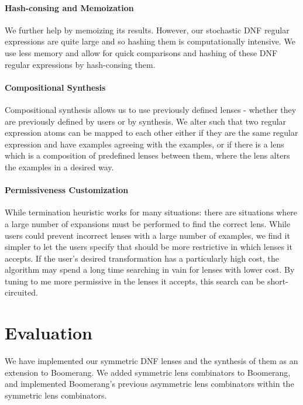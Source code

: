 \documentclass[acmsmall,screen,anonymous]{acmart}
\begin{document}
\paragraph*{Hash-consing and Memoization} We further help \GreedySynth by
memoizing its results.  However, our stochastic DNF regular expressions are
quite large and so hashing them is computationally intensive.  We use less
memory and allow for quick comparisons and hashing of these DNF regular
expressions by hash-consing them.

\paragraph*{Compositional Synthesis} Compositional synthesis allows us to use
previously defined lenses - whether they are previously defined by users or by
synthesis. We alter \GreedySynth such that two regular expression atoms can be
mapped to each other either if they are the same regular expression and have
examples agreeing with the examples, or if there is a lens which is a
composition of predefined lenses between them, where the lens alters the
examples in a desired way.

\paragraph*{\RXSearch Permissiveness Customization}
While termination heuristic works for many situations: there are situations
where a large number of expansions must be performed to find the correct lens.
While users could prevent incorrect lenses with a large number of examples, we
find it simpler to let the users specify that \RXSearch should be more
restrictive in which lenses it accepts. If the user's desired transformation has
a particularly high cost, the algorithm may spend a long time searching in vain
for lenses with lower cost.  By tuning \RXSearch to me more permissive in the
lenses it accepts, this search can be short-circuited.

\section{Evaluation}
\label{sec:evaluation}
We have implemented our symmetric DNF lenses and the synthesis of them as an
extension to Boomerang. We added symmetric lens combinators to Boomerang, and
implemented Boomerang's previous asymmetric lens combinators within the
symmetric lens combinators.
\end{document}
